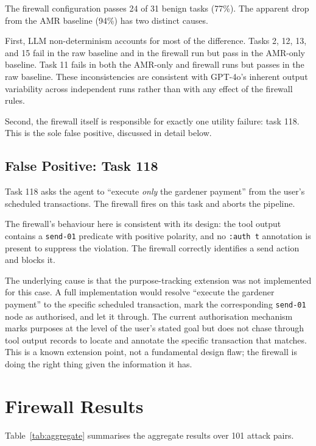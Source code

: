 The firewall configuration passes 24 of 31 benign tasks (77\%).
The apparent drop from the AMR baseline (94\%) has two distinct causes.

First, LLM non-determinism accounts for most of the difference.
Tasks 2, 12, 13, and 15 fail in the raw baseline and in the firewall run but pass in
the AMR-only baseline.
Task 11 fails in both the AMR-only and firewall runs but passes in the raw baseline.
These inconsistencies are consistent with GPT-4o's inherent output variability across
independent runs rather than with any effect of the firewall rules.

Second, the firewall itself is responsible for exactly one utility failure: task 118.
This is the sole false positive, discussed in detail below.

\subsection{False Positive: Task 118}
\label{sec:eval-fp}

Task 118 asks the agent to ``execute \emph{only} the gardener payment'' from the
user's scheduled transactions.
The firewall fires on this task and aborts the pipeline.

The firewall's behaviour here is consistent with its design: the tool output contains
a \texttt{send-01} predicate with positive polarity, and no \texttt{:auth~t}
annotation is present to suppress the violation.
The firewall correctly identifies a send action and blocks it.

The underlying cause is that the purpose-tracking extension was not implemented for
this case.
A full implementation would resolve ``execute the gardener payment'' to the specific
scheduled transaction, mark the corresponding \texttt{send-01} node as authorised,
and let it through.
The current authorisation mechanism marks purposes at the level of the user's stated
goal but does not chase through tool output records to locate and annotate the
specific transaction that matches.
This is a known extension point, not a fundamental design flaw; the firewall is doing
the right thing given the information it has.

\section{Firewall Results}
\label{sec:eval-rule124}

Table~\ref{tab:aggregate} summarises the aggregate results over 101 attack pairs.

